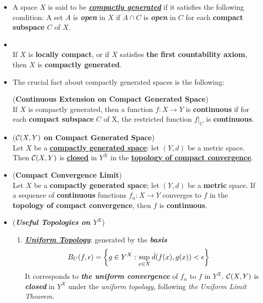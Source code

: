 \documentclass[11pt]{article}
\begin{document}
\begin{itemize}
\item \begin{definition}
A space $X$ is said to be \underline{\emph{\textbf{compactly generated}}} if it satisfies the following condition: A set $A$ is \emph{\textbf{open}} in $X$ if $A \cap C$ is \emph{\textbf{open}} in $C$ for each \textbf{compact subspace} $C$ of $X$.
\end{definition}

\item \begin{lemma} \citep{munkres2000topology}\\
If $X$ is \textbf{locally compact}, or if $X$ satisfies \textbf{the first countability axiom}, then $X$ is \textbf{compactly generated}.
\end{lemma}

\item The crucial fact about compactly generated spaces is the following:
\begin{lemma} (\textbf{Continuous Extension on Compact Generated Space})  \citep{munkres2000topology}\\
If $X$ is compactly generated, then a function $f : X \rightarrow Y$ is \textbf{continuous} if for each \textbf{compact subspace} $C$ of X, the restricted function $f |_{C}$ is \textbf{continuous}.
\end{lemma}


\item \begin{theorem} (\textbf{${\mathcal C}(X, Y)$ on Compact Generated Space})  \citep{munkres2000topology}\\
Let $X$ be a \underline{\textbf{compactly generated space}}: let $(Y, d)$ be a metric space. Then ${\mathcal C}(X, Y)$ is \underline{\textbf{closed}} in $Y^X$ in the \underline{\textbf{topology of compact convergence}}.
\end{theorem}


\item \begin{corollary} (\textbf{Compact Convergence Limit})  \citep{munkres2000topology}\\
Let $X$ be a \textbf{compactly generated space}; let $(Y, d)$ be a \textbf{metric} space. If a sequence of \textbf{continuous} functions $f_n : X \rightarrow Y$ converges to $f$ in the \textbf{topology of compact convergence}, then $f$ is \textbf{continuous}.
\end{corollary}

\item \begin{remark} (\emph{\textbf{Useful Topologies on $Y^X$}})
\begin{enumerate}
\item \underline{\emph{\textbf{Uniform Topology}}}: generated by the \emph{\textbf{basis}}
\begin{align*}
B_{U}(f, \epsilon) &= \left\{g \in Y^X: \sup_{x\in X}\bar{d}(f(x), g(x)) < \epsilon \right\}
\end{align*} It corresponds to \emph{\textbf{the uniform convergence}} of $f_n$ to $f$ in $Y^X$. ${\mathcal C}(X, Y)$ is \emph{\textbf{closed}} in $Y^X$ under the \emph{uniform topology}, following \emph{the Uniform Limit Theorem}.


\end{enumerate}
\end{remark}
\end{itemize}
\end{document}
